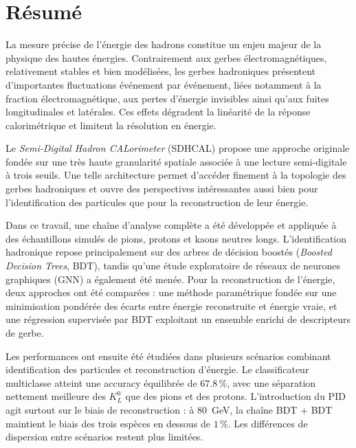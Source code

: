 \documentclass[11pt,a4paper]{report}
\begin{document}
\newpage
\tableofcontents
\newpage

\chapter*{Résumé}
{}

La mesure précise de l’énergie des hadrons constitue un enjeu majeur de la physique des hautes énergies. Contrairement aux gerbes électromagnétiques, relativement stables et bien modélisées, les gerbes hadroniques présentent d’importantes fluctuations événement par événement, liées notamment à la fraction électromagnétique, aux pertes d’énergie invisibles ainsi qu’aux fuites longitudinales et latérales. Ces effets dégradent la linéarité de la réponse calorimétrique et limitent la résolution en énergie.

Le \emph{Semi-Digital Hadron CALorimeter} (SDHCAL) propose une approche originale fondée sur une très haute granularité spatiale associée à une lecture semi-digitale à trois seuils. Une telle architecture permet d’accéder finement à la topologie des gerbes hadroniques et ouvre des perspectives intéressantes aussi bien pour l’identification des particules que pour la reconstruction de leur énergie.

Dans ce travail, une chaîne d’analyse complète a été développée et appliquée à des échantillons simulés de pions, protons et kaons neutres longs. L’identification hadronique repose principalement sur des arbres de décision boostés (\emph{Boosted Decision Trees}, BDT), tandis qu’une étude exploratoire de réseaux de neurones graphiques (GNN) a également été menée. Pour la reconstruction de l’énergie, deux approches ont été comparées : une méthode paramétrique fondée sur une minimisation pondérée des écarts entre énergie reconstruite et énergie vraie, et une régression supervisée par BDT exploitant un ensemble enrichi de descripteurs de gerbe.

Les performances ont ensuite été étudiées dans plusieurs scénarios combinant identification des particules et reconstruction d’énergie. Le classificateur multiclasse atteint une accuracy équilibrée de $67.8\,\%$, avec une séparation nettement meilleure des $K^0_L$ que des pions et des protons. L’introduction du PID agit surtout sur le biais de reconstruction : à 80~GeV, la chaîne BDT + BDT maintient le biais des trois espèces en dessous de $1\,\%$. Les différences de dispersion entre scénarios restent plus limitées.
\end{document}

